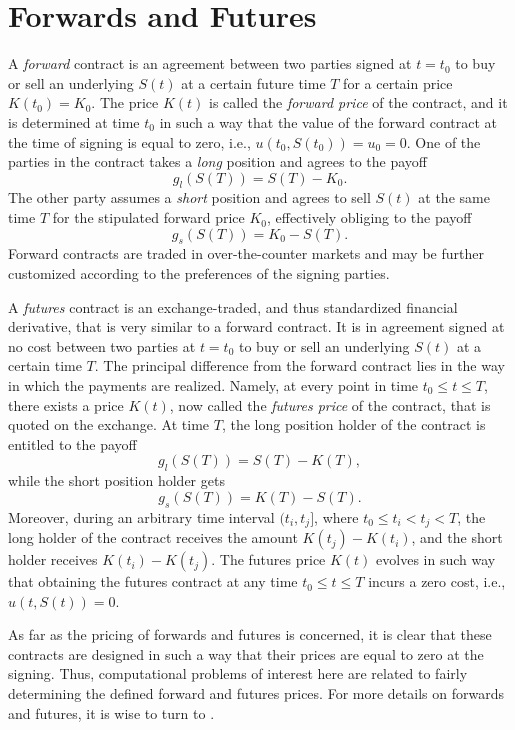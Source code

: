 \documentclass{UUThesisTemplate}
\begin{document}
\section{Forwards and Futures}
\label{sec:futures}
\par A \emph{forward} contract is an agreement between two parties signed at $t=t_0$ to buy or sell an underlying $S(t)$ at a certain future time $T$ for a certain price $K(t_0)=K_0$. The price $K(t)$ is called the \emph{forward price} of the contract, and it is determined at time $t_0$ in such a way that the value of the forward contract at the time of signing is equal to zero, i.e., $u(t_0,S(t_0))=u_0=0$. One of the parties in the contract takes a \emph{long} position and agrees to the payoff 
$$g_l(S(T))=S(T)-K_0.$$
The other party assumes a \emph{short} position and agrees to sell $S(t)$ at the same time $T$ for the stipulated forward price $K_0$, effectively obliging to the payoff 
$$g_s(S(T))=K_0-S(T).$$
Forward contracts are traded in over-the-counter markets and may be further customized according to the preferences of the signing parties.
\par A \emph{futures} contract is an exchange-traded, and thus standardized financial derivative, that is very similar to a forward contract. It is in agreement signed at no cost between two parties at $t=t_0$ to buy or sell an underlying $S(t)$ at a certain time $T$. The principal difference from the forward contract lies in the way in which the payments are realized. Namely, at every point in time $t_0 \leq t \leq T$, there exists a price $K(t)$, now called the \emph{futures price} of the contract, that is quoted on the exchange. At time $T$, the long position holder of the contract is entitled to the payoff 
$$g_l(S(T))=S(T)-K(T),$$
while the short position holder gets 
$$g_s(S(T))=K(T)-S(T).$$
Moreover, during an arbitrary time interval $(t_i,t_j]$, where $t_0 \leq t_i < t_j < T$, the long holder of the contract receives the amount $K(t_j)-K(t_i)$, and the short holder receives $K(t_i)-K(t_j)$. The futures price $K(t)$ evolves in such way that obtaining the futures contract at any time $t_0 \leq t \leq T$ incurs a zero cost, i.e., $u(t,S(t))=0$. 
\par As far as the pricing of forwards and futures is concerned, it is clear that these contracts are designed in such a way that their prices are equal to zero at the signing. Thus, computational problems of interest here are related to fairly determining the defined forward and futures prices. For more details on forwards and futures, it is wise to turn to \cite{duffie1989futures,hull2017options}.  
%
\end{document}
